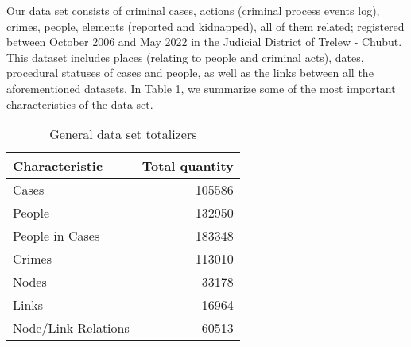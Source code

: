 Our data set consists of criminal cases, actions (criminal process events log), crimes, people, elements (reported and kidnapped), all of them related; registered between October 2006 and May 2022 in the Judicial District of Trelew - Chubut. This dataset includes places (relating to people and criminal acts), dates, procedural statuses of cases and people, as well as the links between all the aforementioned datasets. In Table \ref{tab:TotalizadoresGenerales}, we summarize some of the most important characteristics of the data set.
\vspace{-10pt}
\begin{table}
	\centering
	\label{tab:TotalizadoresGenerales}
	\begin{tabular}{|l|r|}
		\hline
		\textbf{Characteristic} &  \textbf{Total quantity} \\
		\hline
		Cases &  105586 \\
		\hline
		People &  132950 \\
		\hline
		People in Cases &  183348 \\
		\hline
		Crimes &  113010 \\
		\hline
		Nodes &  33178 \\
		\hline
		Links &  16964 \\
		\hline
		Node/Link Relations &  60513 \\
		\hline
	\end{tabular}
	\vspace{10pt}
	\caption{General data set totalizers}
\end{table}
\vspace{-10pt}